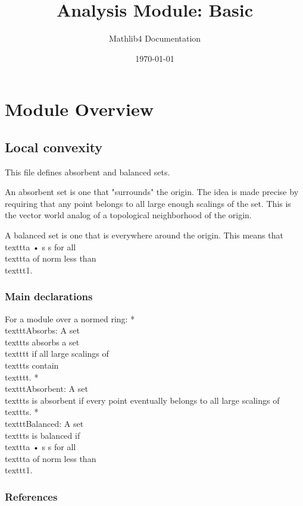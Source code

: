 \documentclass{article}
\title{Analysis Module: Basic}
\author{Mathlib4 Documentation}
\date{\today}
\theoremstyle{definition}
\begin{document}
\maketitle

\section{Module Overview}
\subsection{Local convexity}

This file defines absorbent and balanced sets.

An absorbent set is one that "surrounds" the origin. The idea is made precise by requiring that any
point belongs to all large enough scalings of the set. This is the vector world analog of a
topological neighborhood of the origin.

A balanced set is one that is everywhere around the origin. This means that \\texttt{a • s \subseteq s} for all \\texttt{a}
of norm less than \\texttt{1}.

\subsubsection{Main declarations}

For a module over a normed ring:
* \\texttt{Absorbs}: A set \\texttt{s} absorbs a set \\texttt{t} if all large scalings of \\texttt{s} contain \\texttt{t}.
* \\texttt{Absorbent}: A set \\texttt{s} is absorbent if every point eventually belongs to all large scalings of
  \\texttt{s}.
* \\texttt{Balanced}: A set \\texttt{s} is balanced if \\texttt{a • s \subseteq s} for all \\texttt{a} of norm less than \\texttt{1}.

\subsubsection{References}
\end{document}
